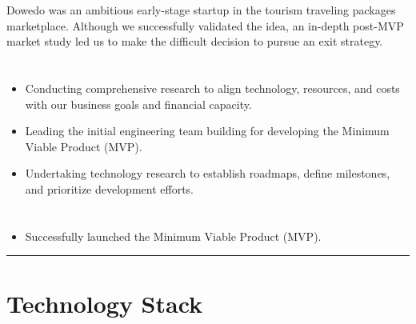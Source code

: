 \documentclass[12pt]{res}
\begin{document}
\begin{resume}
\begin{multicols}{2}
	\columnbreak
	{\footnotesize{Dowedo was an ambitious early-stage startup in the tourism traveling packages marketplace. Although we successfully validated the idea, an in-depth post-MVP market study led us to make the difficult decision to pursue an exit strategy.}}\\
\end{multicols}
\vspace{-20pt}

\begin{multicols}{2}
	\section{}
		\begin{itemize}
			\item Conducting comprehensive research to align technology, resources, and costs with our business goals and financial capacity.

\item Leading the initial engineering team building for developing the Minimum Viable Product (MVP).

\item Undertaking technology research to establish roadmaps, define milestones, and prioritize development efforts.
		\end{itemize}
	\section{}
		\begin{itemize}
			\setlength{\itemindent}{0pt}
			\item Successfully launched the Minimum Viable Product (MVP).
		\end{itemize}
\end{multicols}

\vspace{-20pt}
\begin{minipage}[t]{0.55\linewidth}
	\rule{0.25\textwidth}{2pt}
	\begin{multicols}{2}
		\section{Technology Stack}
		\columnbreak
		\section{}
	\end{multicols}
	\vspace{1pt}
\end{minipage}
\hfill
\begin{minipage}[t]{0.42\linewidth}
	\vspace{18pt}

\end{minipage}
\end{resume}
\end{document}
